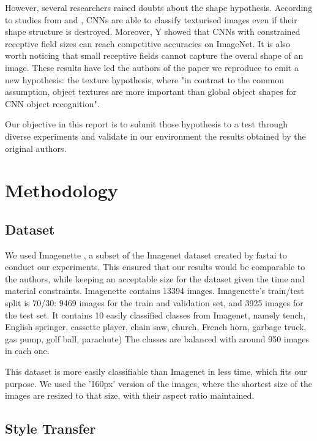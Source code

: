 \documentclass{article}
\begin{document}
\noindent
However, several researchers raised doubts about the shape hypothesis.
According to studies from \cite{gatys2017textures} and \cite{brendel2019approximating}, 
CNNs are able to classify texturised images even if their shape structure is destroyed.
Moreover, Y showed that CNNs with constrained receptive field sizes 
can reach competitive accuracies on ImageNet.
It is also worth noticing that small receptive fields cannot capture the overal shape of an image.
These results have led the authors of the paper we reproduce \cite{geirhos2018imagenettrained} 
to emit a new hypothesis: the texture hypothesis, where "in contrast to the
common assumption, object textures are more important than global object shapes for CNN object
recognition". \medskip \par

\noindent
Our objective in this report is to submit those hypothesis to a test through diverse experiments 
and validate in our environment the results obtained by the original authors.

\newpage
\section{Methodology}

\subsection{Dataset}

We used Imagenette \cite{fastai2019}, a subset of the Imagenet dataset created 
by fastai to conduct our experiments.
This ensured that our results would be comparable to the authors, 
while keeping an acceptable size for the dataset given the time and material constraints.
Imagenette contains 13394 images.
Imagenette's train/test split is 70/30: 9469 images for the train and validation set, and 3925 images for the test set.
It contains 10 easily classified classes from Imagenet, namely
tench, English springer, cassette player, chain saw, church, French horn, garbage truck, gas pump, golf ball, parachute)
The classes are balanced with around 950 images in each one.

This dataset is more easily classifiable than Imagenet in less time, which fits our purpose.
We used the '160px' version of the images, where the shortest size of the images are resized to that size, 
with their aspect ratio maintained.


\subsection{Style Transfer}
\end{document}
